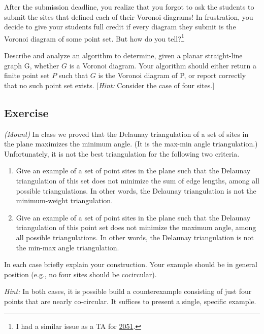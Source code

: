 \documentclass[14pt]{extreport}
\newcounter{counter}
\newcommand{\Exercise}{Exercise \stepcounter{counter}\thecounter}
\begin{document}
    \vspace{3mm}
    After the submission deadline, you realize that you forgot to ask the students to submit the sites that defined each of their Voronoi diagrams! In frustration, you decide to give your students full credit if every diagram they submit is the Voronoi diagram of some point set. But how do you tell?\footnote{I had a similar issue as a TA for \href{https://github.com/sar-mo/CS2051-HonorsDiscreteMath/blob/main/sp23/hw-supplements/hw3-supp/images/colored_map2.pdf}{2051}.}

    \vspace{3mm}
    Describe and analyze an algorithm to determine, given a planar straight-line graph G, whether $G$ is a Voronoi diagram. Your algorithm should either return a finite point set $P$ such that $G$ is the Voronoi diagram of P, or report correctly that no such point set exists. [\textit{Hint:} Consider the case of four sites.]

\subsection*{\Exercise}
    \textit{(Mount)} In class we proved that the Delaunay triangulation of a set of sites in the plane maximizes the
    minimum angle. (It is the max-min angle triangulation.) Unfortunately, it is not the best triangulation
    for the following two criteria.
    \begin{enumerate}
        \item Give an example of a set of point sites in the plane such that the Delaunay triangulation of this set does not minimize the sum of edge lengths, among all possible triangulations. In other words, the Delaunay triangulation is not the minimum-weight triangulation.
        \item Give an example of a set of point sites in the plane such that the Delaunay triangulation of this point set does not minimize the maximum angle, among all possible triangulations. In other words, the Delaunay triangulation is not the min-max angle triangulation.
    \end{enumerate}
    In each case briefly explain your construction. Your example should be in general position (e.g., no
    four sites should be cocircular).
    
    \vspace{2mm}
    \textit{Hint:} In both cases, it is possible build a counterexample consisting of just four points that are nearly co-circular. It suffices to present a single, specific example.
\end{document}
